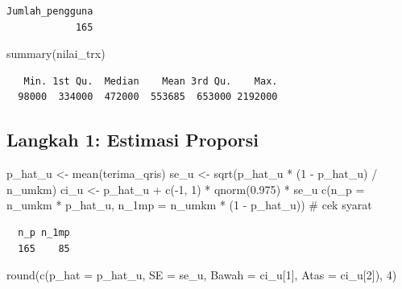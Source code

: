\documentclass[
  indonesian,
  letterpaper,
]{book}
\newenvironment{Shaded}{\begin{snugshade}}{\end{snugshade}}
\newcommand{\AttributeTok}[1]{\textcolor[rgb]{0.40,0.45,0.13}{#1}}
\newcommand{\CommentTok}[1]{\textcolor[rgb]{0.37,0.37,0.37}{#1}}
\newcommand{\DecValTok}[1]{\textcolor[rgb]{0.68,0.00,0.00}{#1}}
\newcommand{\FloatTok}[1]{\textcolor[rgb]{0.68,0.00,0.00}{#1}}
\newcommand{\FunctionTok}[1]{\textcolor[rgb]{0.28,0.35,0.67}{#1}}
\newcommand{\NormalTok}[1]{\textcolor[rgb]{0.00,0.23,0.31}{#1}}
\newcommand{\OtherTok}[1]{\textcolor[rgb]{0.00,0.23,0.31}{#1}}
\newcommand{\SpecialCharTok}[1]{\textcolor[rgb]{0.37,0.37,0.37}{#1}}
\begin{document}
\begin{verbatim}
Jumlah_pengguna 
            165 
\end{verbatim}

\begin{Shaded}
\begin{Highlighting}[]
\FunctionTok{summary}\NormalTok{(nilai\_trx)}
\end{Highlighting}
\end{Shaded}

\begin{verbatim}
   Min. 1st Qu.  Median    Mean 3rd Qu.    Max. 
  98000  334000  472000  553685  653000 2192000 
\end{verbatim}

\subsection{Langkah 1: Estimasi
Proporsi}\label{langkah-1-estimasi-proporsi}

\begin{Shaded}
\begin{Highlighting}[]
\NormalTok{p\_hat\_u }\OtherTok{\textless{}{-}} \FunctionTok{mean}\NormalTok{(terima\_qris)}
\NormalTok{se\_u }\OtherTok{\textless{}{-}} \FunctionTok{sqrt}\NormalTok{(p\_hat\_u }\SpecialCharTok{*}\NormalTok{ (}\DecValTok{1} \SpecialCharTok{{-}}\NormalTok{ p\_hat\_u) }\SpecialCharTok{/}\NormalTok{ n\_umkm)}
\NormalTok{ci\_u }\OtherTok{\textless{}{-}}\NormalTok{ p\_hat\_u }\SpecialCharTok{+} \FunctionTok{c}\NormalTok{(}\SpecialCharTok{{-}}\DecValTok{1}\NormalTok{, }\DecValTok{1}\NormalTok{) }\SpecialCharTok{*} \FunctionTok{qnorm}\NormalTok{(}\FloatTok{0.975}\NormalTok{) }\SpecialCharTok{*}\NormalTok{ se\_u}
\FunctionTok{c}\NormalTok{(}\AttributeTok{n\_p =}\NormalTok{ n\_umkm }\SpecialCharTok{*}\NormalTok{ p\_hat\_u, }\AttributeTok{n\_1mp =}\NormalTok{ n\_umkm }\SpecialCharTok{*}\NormalTok{ (}\DecValTok{1} \SpecialCharTok{{-}}\NormalTok{ p\_hat\_u))   }\CommentTok{\# cek syarat}
\end{Highlighting}
\end{Shaded}

\begin{verbatim}
  n_p n_1mp 
  165    85 
\end{verbatim}

\begin{Shaded}
\begin{Highlighting}[]
\FunctionTok{round}\NormalTok{(}\FunctionTok{c}\NormalTok{(}\AttributeTok{p\_hat =}\NormalTok{ p\_hat\_u, }\AttributeTok{SE =}\NormalTok{ se\_u, }\AttributeTok{Bawah =}\NormalTok{ ci\_u[}\DecValTok{1}\NormalTok{], }\AttributeTok{Atas =}\NormalTok{ ci\_u[}\DecValTok{2}\NormalTok{]), }\DecValTok{4}\NormalTok{)}
\end{Highlighting}
\end{Shaded}
\end{document}
